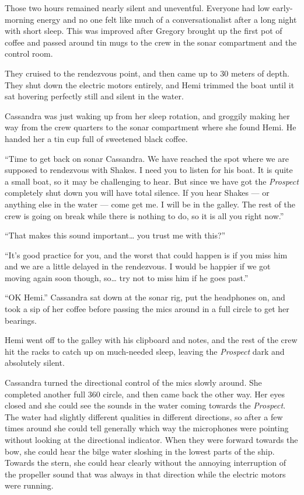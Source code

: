 \documentclass[]{scrbook}
\begin{document}
Those two hours remained nearly silent and uneventful. Everyone had low
early-morning energy and no one felt like much of a conversationalist
after a long night with short sleep. This was improved after Gregory
brought up the first pot of coffee and passed around tin mugs to the
crew in the sonar compartment and the control room.

They cruised to the rendezvous point, and then came up to 30 meters of
depth. They shut down the electric motors entirely, and Hemi trimmed the
boat until it sat hovering perfectly still and silent in the water.

Cassandra was just waking up from her sleep rotation, and groggily
making her way from the crew quarters to the sonar compartment where she
found Hemi. He handed her a tin cup full of sweetened black coffee.

``Time to get back on sonar Cassandra. We have reached the spot where we
are supposed to rendezvous with Shakes. I need you to listen for his
boat. It is quite a small boat, so it may be challenging to hear. But
since we have got the \emph{Prospect} completely shut down you will have
total silence. If you hear Shakes --- or anything else in the water ---
come get me. I will be in the galley. The rest of the crew is going on
break while there is nothing to do, so it is all you right now.''

``That makes this sound important\ldots{} you trust me with this?''

``It's good practice for you, and the worst that could happen is if you
miss him and we are a little delayed in the rendezvous. I would be
happier if we got moving again soon though, so\ldots{} try not to miss
him if he goes past.''

``OK Hemi.'' Cassandra sat down at the sonar rig, put the headphones on,
and took a sip of her coffee before passing the mics around in a full
circle to get her bearings.

Hemi went off to the galley with his clipboard and notes, and the rest
of the crew hit the racks to catch up on much-needed sleep, leaving the
\emph{Prospect} dark and absolutely silent.

Cassandra turned the directional control of the mics slowly around. She
completed another full 360 circle, and then came back the other way. Her
eyes closed and she could see the sounds in the water coming towards the
\emph{Prospect}. The water had slightly different qualities in different
directions, so after a few times around she could tell generally which
way the microphones were pointing without looking at the directional
indicator. When they were forward towards the bow, she could hear the
bilge water sloshing in the lowest parts of the ship. Towards the stern,
she could hear clearly without the annoying interruption of the
propeller sound that was always in that direction while the electric
motors were running.
\end{document}
